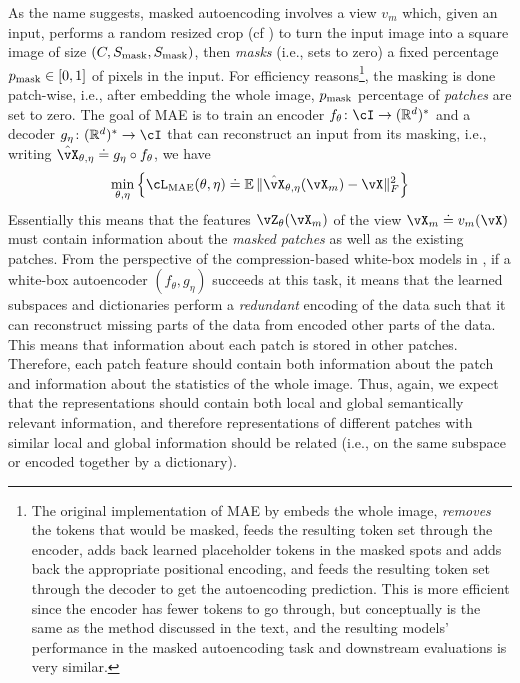 \documentclass[../../book-main.tex]{subfiles}
\begin{document}
As the name suggests, masked autoencoding involves a view \(v_{m}\) which, given an input, performs a random resized crop (cf ) to turn the input image into a square image of size \((C, S_{\mathrm{mask}}, S_{\mathrm{mask}})\), then \textit{masks} (i.e., sets to zero) a fixed percentage \(p_{\mathrm{mask}} \in [0, 1]\) of pixels in the input. For efficiency reasons\footnote{The original implementation of MAE by \cite{he2022masked} embeds the whole image, \textit{removes} the tokens that would be masked, feeds the resulting token set through the encoder, adds back learned placeholder tokens in the masked spots and adds back the appropriate positional encoding, and feeds the resulting token set through the decoder to get the autoencoding prediction. This is more efficient since the encoder has fewer tokens to go through, but conceptually is the same as the method discussed in the text, and the resulting models' performance in the masked autoencoding task and downstream evaluations is very similar.}, the masking is done patch-wise, i.e.,  after embedding the whole image, \(p_{\mathrm{mask}}\) percentage of \textit{patches} are set to zero. The goal of MAE is to train an encoder \(f_{\theta} \colon \cI \to (\R^{d})^{*}\) and a decoder \(g_{\eta} \colon (\R^{d})^{*} \to \cI\) that can reconstruct an input from its masking, i.e., writing \(\hat{\vX}_{\theta, \eta} \doteq g_{\eta} \circ f_{\theta}\), we have
\begin{equation}
    \min_{\theta, \eta}\bc{\cL_{\mathrm{MAE}}(\theta, \eta) \doteq \Ex\norm{\hat{\vX}_{\theta, \eta}(\vX_{m}) - \vX}_{F}^{2}}
\end{equation}
Essentially this means that the features \(\vZ_{\theta}(\vX_{m})\) of the view \(\vX_{m} \doteq v_{m}(\vX)\) must contain information about the \textit{masked patches} as well as the existing patches. From the perspective of the compression-based white-box models in , if a white-box autoencoder  \((f_{\theta}, g_{\eta})\) succeeds at this task, it means that the learned subspaces and dictionaries perform a \textit{redundant} encoding of the data such that it can reconstruct missing parts of the data from encoded other parts of the data. This means that information about each patch is stored in other patches. Therefore, each patch feature should contain both information about the patch and information about the statistics of the whole image. Thus, again, we expect that the representations should contain both local and global semantically relevant information, and therefore representations of different patches with similar local and global information should be related (i.e., on the same subspace or encoded together by a dictionary).
\end{document}
